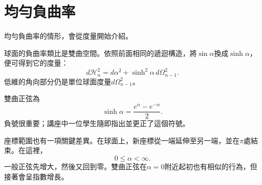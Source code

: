 \begin{classroomqa}
\end{classroomqa}

\begin{classroomqa}
\end{classroomqa}

\begin{classroomqa}
\end{classroomqa}

\section{均勻負曲率}

均勻負曲率的情形，會從度量開始介紹。

球面的負曲率類比是雙曲空間。依照前面相同的遞迴構造，將\(\sin\alpha\)換成\(\sinh\alpha\)，便可得到它的度量：
\begin{equation}
d\mathcal H_n^2=d\alpha^2+\sinh^2\alpha\,d\Omega_{n-1}^2.
\end{equation}
低維的角向部分仍是單位球面度量\(d\Omega_{n-1}^2\)。

\begin{classroomqa}
\end{classroomqa}

雙曲正弦為
\begin{equation}
\sinh\alpha=\frac{e^\alpha-e^{-\alpha}}{2}.
\end{equation}
負號很重要；講座中一位學生隨即指出並更正了這個符號。

座標範圍也有一項關鍵差異。在球面上，新座標從一端延伸至另一端，並在\(\pi\)處結束。在這裡，
\begin{equation}
0\leq \alpha<\infty.
\end{equation}
一般正弦先增大，然後又回到零。雙曲正弦在\(\alpha=0\)附近起初也有相似的行為，但接著會呈指數增長。

